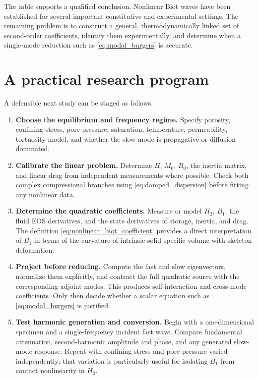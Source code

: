 \documentclass[11pt]{article}
\begin{document}
The table supports a qualified conclusion.  Nonlinear Biot waves have been
established for several important constitutive and experimental settings.
The remaining problem is to construct a general, thermodynamically linked set
of second-order coefficients, identify them experimentally, and determine when
a single-mode reduction such as \eqref{eq:modal_burgers} is accurate.

\section{A practical research program}

A defensible next study can be staged as follows.
\begin{enumerate}[leftmargin=2em]
    \item \textbf{Choose the equilibrium and frequency regime.}
    Specify porosity, confining stress, pore pressure, saturation, temperature,
    permeability, tortuosity model, and whether the slow mode is propagative or
    diffusion dominated.

    \item \textbf{Calibrate the linear problem.}
    Determine \(H\), \(M_0\), \(B_0\), the inertia matrix, and linear drag from
    independent measurements where possible.  Check both complex
    compressional branches using \eqref{eq:damped_dispersion} before fitting
    any nonlinear data.

    \item \textbf{Determine the quadratic coefficients.}
    Measure or model \(H_2\), \(B_1\), the fluid EOS derivatives, and the state
    derivatives of storage, inertia, and drag.  The definition
    \eqref{eq:nonlinear_biot_coefficient} provides a direct interpretation of
    \(B_1\) in terms of the curvature of intrinsic solid specific volume with
    skeleton deformation.

    \item \textbf{Project before reducing.}
    Compute the fast and slow eigenvectors, normalize them explicitly, and
    contract the full quadratic source with the corresponding adjoint modes.
    This produces self-interaction and cross-mode coefficients.  Only then
    decide whether a scalar equation such as \eqref{eq:modal_burgers} is
    justified.

    \item \textbf{Test harmonic generation and conversion.}
    Begin with a one-dimensional specimen and a single-frequency incident fast
    wave.  Compare fundamental attenuation, second-harmonic amplitude and
    phase, and any generated slow-mode response.  Repeat with confining stress
    and pore pressure varied independently; that variation is particularly
    useful for isolating \(B_1\) from contact nonlinearity in \(H_2\).
\end{enumerate}
\end{document}

